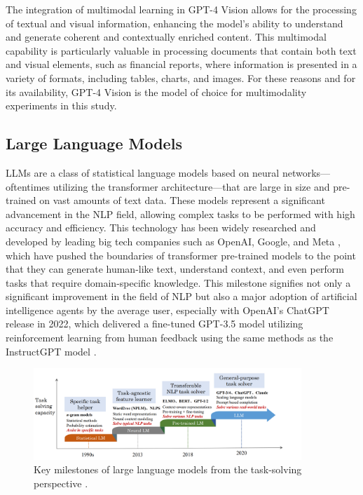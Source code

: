 \documentclass[english, 12pt, a4paper, elec, utf8, a-2b, online]{aaltothesis}
\begin{document}
The integration of multimodal learning in GPT-4 Vision allows for the processing of textual and visual information, enhancing the model's ability to understand and generate coherent and contextually enriched content.
This multimodal capability is particularly valuable in processing documents that contain both text and visual elements, such as financial reports, where information is presented in a variety of formats, including tables, charts, and images.
For these reasons and for its availability, GPT-4 Vision is the model of choice for multimodality experiments in this study.

\subsection{Large Language Models}

\ac{LLM}s are a class of statistical language models based on neural networks—oftentimes utilizing the transformer architecture—that are large in size and pre-trained on vast amounts of text data.
These models represent a significant advancement in the \ac{NLP} field, allowing complex tasks to be performed with high accuracy and efficiency.
This technology has been widely researched and developed by leading big tech companies such as OpenAI, Google, and Meta \cite{Brown2020, Devlin2019, Radford2021, OpenAI2023GPT4, Gemini2022, Gemini2024}, which have pushed the boundaries of transformer pre-trained models to the point that they can generate human-like text, understand context, and even perform tasks that require domain-specific knowledge.
This milestone signifies not only a significant improvement in the field of \ac{NLP} but also a major adoption of artificial intelligence agents by the average user, especially with OpenAI's ChatGPT release in 2022, which delivered a fine-tuned GPT-3.5 model utilizing reinforcement learning from human feedback using the same methods as the InstructGPT model \cite{Ouyang2022}.

\begin{figure}[H]
    \centering
    \includegraphics[width=0.9\textwidth]{images/llms_milestones.png}
    \caption{Key milestones of large language models from the task-solving perspective \cite{Zhao2023}.}
    \label{fig:llms_milestones}
\end{figure}
\end{document}

